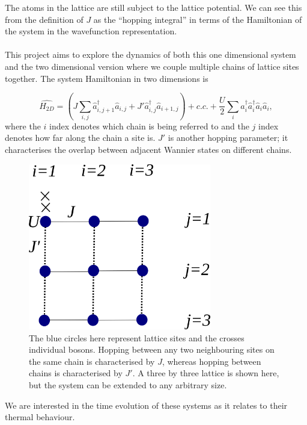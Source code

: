 \documentclass[a4paper,10pt]{article}
\begin{document}
The atoms in the lattice are still subject to the lattice potential. We can see this from the definition of $J$ as the ``hopping integral'' in terms of the Hamiltonian of
the system in the wavefunction representation.
\\\\
This project aims to explore the dynamics of both this one dimensional system and the two dimensional version where we couple multiple chains of lattice sites together. The 
system Hamiltonian in two dimensions is
 
\begin{equation}
\hat{H_{2D}}=(J\sum_{i,j}\hat{a}^\dagger_{i,j+1}\hat{a}_{i,j} + J'\hat{a}^\dagger_{i,j}\hat{a}_{i+1,j})+c.c. +\frac{U}{2}\sum_{i}\hat{a}^\dagger_{i}\hat{a}^\dagger_{i}\hat{a}_{i}\hat{a}_{i},
\end{equation}
where the $i$ index denotes which chain is being referred to and the $j$ index denotes how far along the chain a site is. $J'$ is another hopping parameter; it characterises the 
overlap between adjacent Wannier states on different chains.
\begin{figure}[H]
 \begin{center}
   \includegraphics[width=8cm]{lattice_pic}
 \end{center}
 \caption{The blue circles here represent lattice sites and the crosses individual bosons. Hopping between any two neighbouring sites on the same chain is characterised by $J$, whereas hopping 
 between chains is characterised by $J'$. A three by three lattice is shown here, but the system can be extended to any arbitrary size.}
 \end{figure}

 
We are interested in the time evolution of these systems as it relates to their thermal behaviour.
\end{document}

